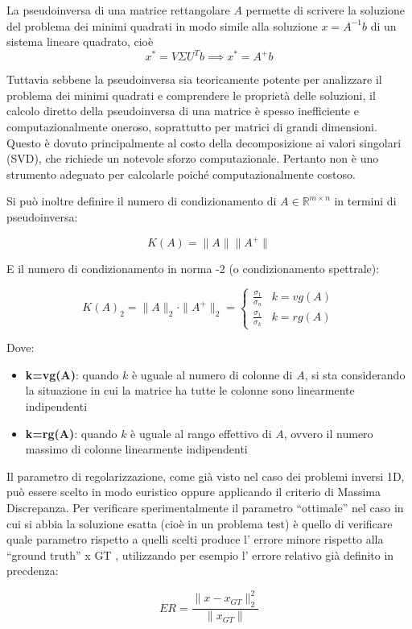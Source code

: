 La pseudoinversa di una matrice rettangolare $A$ permette di scrivere la soluzione del problema dei minimi quadrati in modo simile alla soluzione $x=A^{-1}b$ di un sistema lineare quadrato, cioè
\[
    x^* = V\Sigma U^T b \implies x^* = A^+ b
\]

Tuttavia sebbene la pseudoinversa sia teoricamente potente per analizzare il problema dei minimi quadrati e comprendere le proprietà delle soluzioni, il calcolo diretto della pseudoinversa di una matrice è spesso inefficiente e computazionalmente oneroso, soprattutto per matrici di grandi dimensioni. Questo è dovuto principalmente al costo della decomposizione ai valori singolari (SVD), che richiede un notevole sforzo computazionale. Pertanto non è uno strumento adeguato per calcolarle poiché computazionalmente costoso.

Si può inoltre definire il numero di condizionamento di $A \in \mathbb{R}^{m\times n}$ in termini di pseudoinversa:

\[
    K(A)  = \|A\|\|A^+\|
\]
 
E il numero di condizionamento in norma -2 (o condizionamento spettrale):

\[
    K(A)_2 = \|A\|_2 \cdot \| A^+\|_2 = \begin{cases}
        \frac{\sigma_1}{\sigma_n} & k = vg (A) \\
        \frac{\sigma_1}{\sigma_k} & k = rg(A)
    \end{cases}
\]

Dove: 
\begin{itemize}
    \item \textbf{k=vg(A)}: quando $k$ è uguale al numero di colonne di $A$, si sta considerando la situazione in cui la matrice ha tutte le colonne sono linearmente indipendenti
    \item \textbf{k=rg(A)}: quando $k$ è uguale al rango effettivo di $A$, ovvero il numero massimo di colonne linearmente indipendenti
\end{itemize}

Il parametro di regolarizzazione, come già visto nel caso dei problemi inversi 1D, può
essere scelto in modo euristico oppure applicando il criterio di Massima Discrepanza.
Per verificare sperimentalmente il parametro “ottimale” nel caso in cui si abbia la
soluzione esatta (cioè in un problema test) è quello di verificare quale parametro
rispetto a quelli scelti produce l’ errore minore rispetto alla “ground truth” x GT ,
utilizzando per esempio l’ errore relativo già definito in precdenza:

\[
    ER = \frac{\|x-x_{GT}\|_2^2}{\|x_{GT}\|}    
\]
